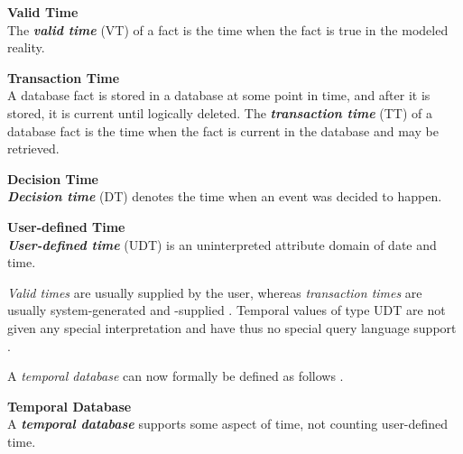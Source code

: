 \begin{svgraybox}
\vspace{-10pt}
\begin{definition}\textbf{Valid Time}\\
The \emph{\textbf{valid time}} (VT) of a fact is the time when the fact is true in the modeled reality.
\end{definition}

\begin{definition}\textbf{Transaction Time}\\
A database fact is stored in a database at some point in time, and after it is stored, it is current until logically deleted. The \emph{\textbf{transaction time}} (TT) of a database fact is the time when the fact is current in the database and may be retrieved.
\end{definition}

\begin{definition}\textbf{Decision Time}\\
\emph{\textbf{Decision time}} (DT) denotes the time when an event was decided to happen.
\end{definition}

\begin{definition}\textbf{User-defined Time}\\
\emph{\textbf{User-defined time}} (UDT) is an uninterpreted attribute domain of date and time.
\end{definition}
\vspace{-10pt}
\end{svgraybox}

\emph{Valid times} are usually supplied by the user, whereas \emph{transaction times} are usually system-generated and -supplied \cite{Dyreson1994}. Temporal values of type UDT are not given any special interpretation and have thus no special query language support \cite{Dyreson1994}.

A \emph{temporal database} can now formally be defined as follows \cite{Dyreson1994}.

\begin{svgraybox}
\vspace{-10pt}
\begin{definition}\textbf{Temporal Database}\\
A \emph{\textbf{temporal database}} supports some aspect of time, not counting user-defined time.
\end{definition}
\vspace{-10pt}
\end{svgraybox}

